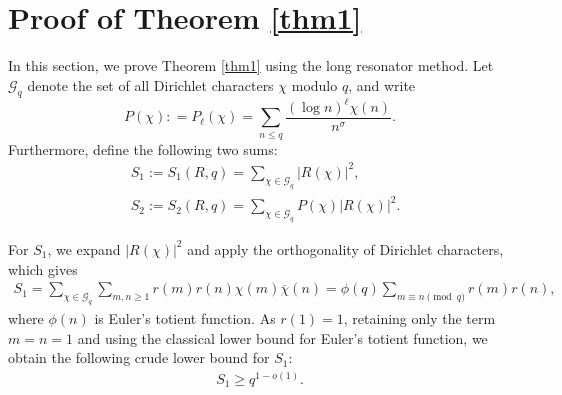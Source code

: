\documentclass[12pt,reqno]{amsart}
\theoremstyle{definition}
\numberwithin{equation}{section}
\newcommand{\mcg}{\mathcal{G}}
\newcommand{\ol}{\overline}
\begin{document}
\section{Proof of Theorem \ref{thm1}}
\label{sec-prove}

In this section, we prove Theorem \ref{thm1} using the long resonator method. Let \(\mcg_q\) denote the set of all Dirichlet characters \(\chi\) modulo \(q\), and write
\[
P(\chi) : = P_\ell(\chi) = \sum_{n \le q}\frac{(\log n )^\ell \chi(n)}{n^\sigma}.
\]
Furthermore, define the following two sums:
\begin{align*}
    & S_1 := S_1(R,q) = \sum_{\chi \in \mcg_q}|R(\chi)|^2, \\
    & S_2 := S_2(R,q) = \sum_{\chi \in \mcg_q}P(\chi) |R(\chi)|^2.
\end{align*}

\par
For \(S_1\), we expand \(|R(\chi)|^2\) and apply the orthogonality of Dirichlet characters, which gives 
\begin{align}
\label{S1eq}
    S_1 = \sum_{\chi \in \mcg_q} \sum_{m,n \ge 1} r(m)r(n)\chi(m)\ol\chi(n) = \phi(q)\sum_{m \equiv n \pmod q} r(m)r(n),
\end{align}
where \(\phi(n)\) is Euler’s totient function. As \(r(1)=1\), retaining only the term \(m=n=1\) and using the classical lower bound for Euler’s totient function, we obtain the following crude lower bound for \(S_1\):
\begin{align}
    \label{S1lower}
    S_1 \ge q^{1-o(1)}.
\end{align}
\end{document}
